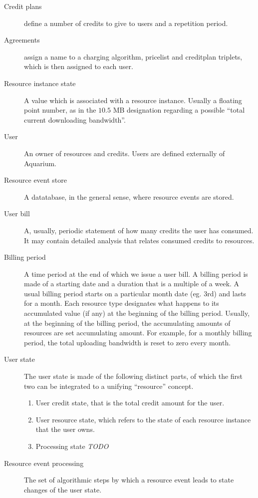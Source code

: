 \documentclass[preprint,10pt]{sigplanconf}
\newcommand{\TODO}{{\sl TODO \marginpar{\sl TODO}}}
\begin{document}
\begin{description}
\item[Credit plans] define a number of credits to give to users and a repetition
        period.

\item[Agreements] assign a name to a charging algorithm, pricelist and creditplan triplets,
        which is then assigned to each user.
        

\item[Resource instance state]
A value which is associated with a resource instance. Usually a floating point number, as in the $10.5$ MB designation regarding a possible ``total current downloading bandwidth''.

\item[User]
An owner of resources and credits. Users are defined externally of Aquarium.

\item[Resource event store]
A datatabase, in the general sense, where resource events are stored.

\item[User bill]
A, usually, periodic statement of how many credits the user has consumed. It may contain detailed analysis that relates consumed credits to resources.
  
\item[Billing period]
A time period at the end of which we issue a user bill.
A billing period is made of a starting date and a duration that is a multiple of a week.
A usual billing period starts on a particular month date (eg. 3rd) and lasts for a month.
Each resource type designates what happens to its accumulated value (if any) at the beginning of the billing period. Usually, at the beginning of the billing period, the accumulating amounts of resources are set accumulating amount. For example, for a monthly billing period, the total uploading bandwidth is reset to zero every month.
   
\item[User state]
The user state is made of the following distinct parts, of which the first two can be integrated to a unifying ``resource'' concept.

\begin{enumerate}
\item User credit state, that is the total credit amount for the user.

\item User resource state, which refers to the state of each resource instance that the user owns.

\item Processing state \TODO
\end{enumerate}

\item[Resource event processing]
The set of algorithmic steps by which a resource event leads to state changes of the user state.

\end{description}
\end{document}
